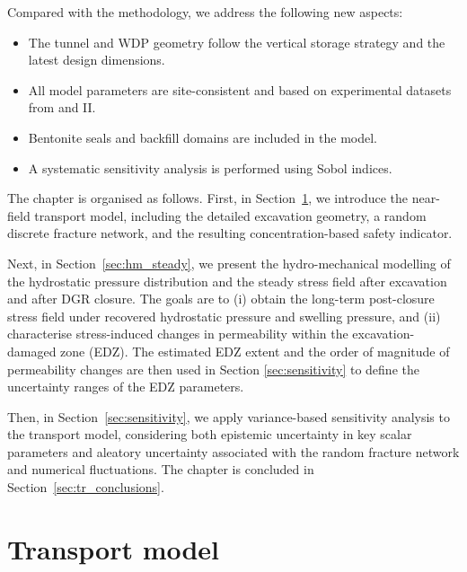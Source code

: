 Compared with the methodology, we address the following new aspects:
\begin{itemize}
    \item The tunnel and \gls{WDP} geometry follow the vertical storage strategy and the latest design dimensions.
    \item All model parameters are site-consistent and based on experimental datasets from \URFBI and II.
    \item Bentonite seals and backfill domains are included in the model.
    \item A systematic sensitivity analysis is performed using Sobol indices.
\end{itemize}

The chapter is organised as follows. First, in Section~\ref{sec:transport_model}, we introduce the near-field transport model, including the detailed excavation
geometry, a random discrete fracture network, and the resulting concentration-based safety indicator.

Next, in Section~\ref{sec:hm_steady}, we present the hydro-mechanical modelling of the hydrostatic pressure distribution and the steady stress field after excavation and after \gls{DGR} closure. The goals are to
(i) obtain the long-term post-closure stress field under recovered hydrostatic pressure and swelling pressure, and
(ii) characterise stress-induced changes in permeability within the excavation-damaged zone (EDZ). The estimated EDZ extent
and the order of magnitude of permeability changes are then used in Section \ref{sec:sensitivity} to define the uncertainty ranges of the EDZ parameters.

Then, in Section~\ref{sec:sensitivity}, we apply variance-based sensitivity analysis to the transport model,
considering both epistemic uncertainty in key scalar parameters and aleatory uncertainty associated with the random fracture
network and numerical fluctuations. The chapter is concluded in Section~\ref{sec:tr_conclusions}.






\section{Transport model}
\label{sec:transport_model}
%
